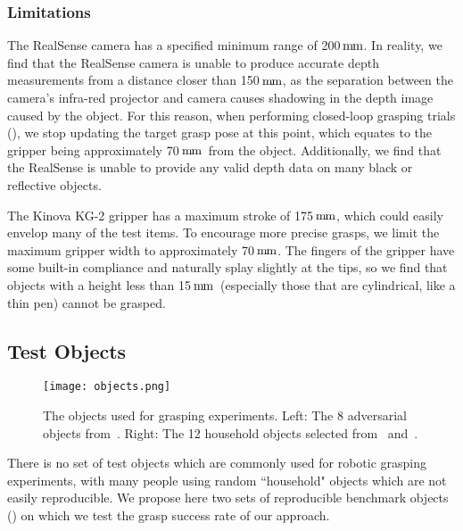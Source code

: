\documentclass[conference]{IEEEtran}
\newcommand{\pack}	{\hspace{-0.08em}}
\newcommand{\mm}	{\ensuremath{\rm\,m\pack m}}
\begin{document}
\subsubsection{Limitations}
\label{sec:limitations}

The RealSense camera has a specified minimum range of 200\mm.  In reality, we find that the RealSense camera is unable to produce accurate depth measurements from a distance closer than 150\mm, as the separation between the camera's infra-red projector and camera causes shadowing in the depth image caused by the object.  For this reason, when performing closed-loop grasping trials (), we stop updating the target grasp pose at this point, which equates to the gripper being approximately 70\mm~from the object.  Additionally, we find that the RealSense is unable to provide any valid depth data on many black or reflective objects.

The Kinova KG-2 gripper has a maximum stroke of 175\mm, which could easily envelop many of the test items. To encourage more precise grasps, we limit the maximum gripper width to approximately 70\mm.  The fingers of the gripper have some built-in compliance and naturally splay slightly at the tips, so we find that objects with a height less than 15\mm~(especially those that are cylindrical, like a thin pen) cannot be grasped.


\subsection{Test Objects}
\label{sec:objects}

\begin{figure}[tpb]
    \centering
    \texttt{[image: objects.png]}
    \vspace{-6mm}
    \caption{The objects used for grasping experiments. Left: The 8 adversarial objects from~\cite{Mahler2017Dex2}. Right: The 12 household objects selected from~\cite{calli2017ycb} and~\cite{leitner2017acrvpicking}.
    }
  \label{fig:objects} 
  \vspace{-6mm}
\end{figure}

There is no set of test objects which are commonly used for robotic grasping experiments, with many people using random ``household" objects which are not easily reproducible.  We propose here two sets of reproducible benchmark objects () on which we test the grasp success rate of our approach.
\end{document}
